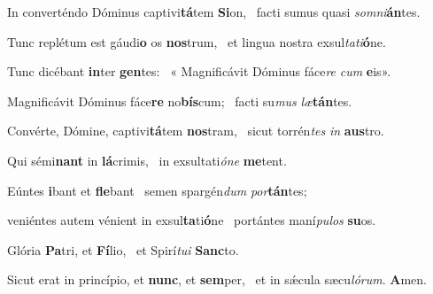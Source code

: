 \item In converténdo Dóminus captivi\textbf{tá}tem \textbf{Si}on,~\psstar{} facti sumus quasi \textit{somni}\textbf{án}tes.

\item Tunc replétum est gáudi\textbf{o} os \textbf{nos}trum,~\psstar{} et lingua nostra exsul\textit{tati}\textbf{ó}ne.

\item Tunc dicébant \textbf{in}ter \textbf{gen}tes:~\psstar{} « Magnificávit Dóminus fáce\textit{re} \textit{cum} \textbf{e}is».

\item Magnificávit Dóminus fáce\textbf{re} no\textbf{bís}cum;~\psstar{} facti su\textit{mus} \textit{læ}\textbf{tán}tes.

\item Convérte, Dómine, captivi\textbf{tá}tem \textbf{nos}tram,~\psstar{} sicut torrén\textit{tes} \textit{in} \textbf{aus}tro.

\item Qui sémi\textbf{nant} in \textbf{lá}crimis,~\psstar{} in exsultati\textit{óne} \textbf{me}tent.

\item Eúntes \textbf{i}bant et \textbf{fle}bant~\psstar{} semen spargén\textit{dum} \textit{por}\textbf{tán}tes;

\item veniéntes autem vénient in exsul\textbf{ta}ti\textbf{ó}ne~\psstar{} portántes maní\textit{pulos} \textbf{su}os.

\item Glória \textbf{Pa}tri, et \textbf{Fí}lio,~\psstar{} et Spirí\textit{tui} \textbf{Sanc}to.

\item Sicut erat in princípio, et \textbf{nunc}, et \textbf{sem}per,~\psstar{} et in sǽcula sæcu\textit{lórum}. \textbf{A}men.